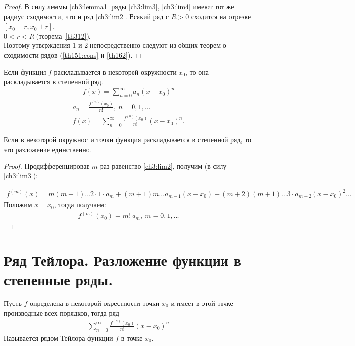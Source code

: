 \begin{proof}
  В силу леммы \eqref{ch3:lemma1} ряды \eqref{ch3:lim3}, \eqref{ch3:lim4} имеют
  тот же радиус сходимости, что и ряд \eqref{ch3:lim2}. Всякий ряд с $R >
  0$ сходится на отрезке $[x_0 - r, x_0 + r]$, \\
  $0 < r < R \ $(теорема~\eqref{th312}). \\
  Поэтому утверждения 1 и 2 непосредственно следуют из общих теорем о
  сходимости рядов (\eqref{th151:cons} и \eqref{th162}).
\end{proof}

\begin{theorem}
  Если функция $f$ раскладывается в некоторой окружности $x_0$, то она
  раскладывается в степенной ряд.
  \begin{gather*}
    f(x) = \sum\limits_{n = 0}^{\infty} a_n (x - x_0)^n
  \end{gather*}
  \begin{gather}
    a_n = \frac{f^{(n)}(x_0)}{n!}, \ n = 0, 1, \dots \label{ch3:lim5} \\
    f(x) = \sum\limits_{n = 0}^{\infty} \frac{f^{(n)}(x_0)}{n!} (x - x_0)^n
    \label{ch3:lim6}.
  \end{gather}
\end{theorem}

\begin{consequence}
  \label{th322:cons}
  Если в некоторой окружности точки функция раскладывается в степенной ряд, то
  это разложение единственно.
\end{consequence}

\begin{proof}
  Продифференцировав $m$ раз равенство \eqref{ch3:lim2}, получим (в силу \eqref{ch3:lim3}):

  \begin{gather*}
    f^{(m)}(x) = m(m-1)\dots 2 \cdot 1 \cdot a_m +
    (m+1)m \dots a_{m-1} (x-x_0) + (m+2)(m+1) \dots 3 \cdot a_{m-2} (x -
    x_0)^2\dots
  \end{gather*}
  Положим $x = x_0$, тогда получаем:
  \begin{gather*}
    f^{(m)}(x_0) = m! \ a_m, \ m = 0, 1, \dots
  \end{gather*}
\end{proof}

\section{Ряд Тейлора. Разложение функции в степенные ряды.}
\begin{definition}
  Пусть $f$ определена в некоторой окрестности точки $x_0$ и имеет в этой точке
  производные всех порядков, тогда ряд
  \begin{gather}
    \sum\limits_{n = 0}^{\infty} \frac{f^{(n)}(x_0)}{n!} (x-x_0)^n
    \label{def331:series1}
  \end{gather}
  Называется рядом Тейлора функции $f$ в точке $x_0$.
\end{definition}


